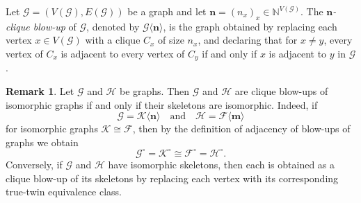 \documentclass[11pt]{amsart}
\numberwithin{equation}{section}
\theoremstyle{plain}
\theoremstyle{definition}
\newtheorem{remark}[theorem]{Remark}
\theoremstyle{remark}
\newcommand{\F}{{\mathcal{F}}}
\newcommand{\G}{{\mathcal{G}}}
\renewcommand{\H}{{\mathcal{H}}}
\newcommand{\K}{{\mathcal{K}}}
\newcommand{\bN}{\mathbb{N}}
\newcommand{\qand}{\quad\text{and}\quad}
\newcommand{\bo}[1]{\mathbf{#1}} %
\begin{document}
Let $\G=(V(\G),E(\G))$ be a graph and let $\bo{n}=(n_x)_x\in \bN^{V(\G)}$.
The \emph{$\bo{n}$-clique blow-up} of $\G$, denoted by $\G\langle \bo{n} \rangle$, is the graph obtained by replacing each vertex $x\in V(\G)$ with a clique $C_x$ of size $n_x$, and declaring that for $x\neq y$, every vertex of $C_x$ is adjacent to every vertex of $C_y$ if and only if $x$ is adjacent to $y$ in $\G$.

\begin{remark} \label{rmk:cliqueblow}
Let $\G$ and $\H$ be graphs. Then $\G$ and $\H$ are clique blow-ups of isomorphic graphs if and only if their skeletons are isomorphic.
Indeed, if 
\[
\G=\K\langle \bo{n}\rangle \qand \H=\F\langle \bo{m}\rangle
\]
for isomorphic graphs $\K\cong \F$, then by the definition of adjacency of blow-ups of graphs we obtain 
\[
\G^\circ=\K^\circ \cong \F^\circ=\H^\circ.
\]
Conversely, if $\G$ and $\H$ have isomorphic skeletons, then each is obtained as a clique blow-up of its skeletons by replacing each vertex with its corresponding true-twin equivalence class.
\end{remark}
\end{document}
